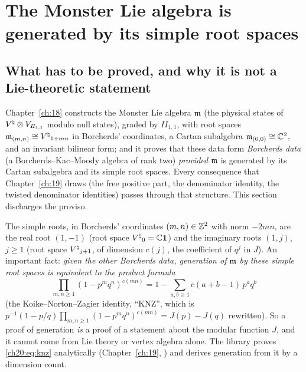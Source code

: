 \section{The Monster Lie algebra is generated by its simple root spaces}\label{ch20:sec:generation}

\subsection{What has to be proved, and why it is not a Lie-theoretic statement}

Chapter~\ref{ch:18} constructs the Monster Lie algebra $\mathfrak m$ (the physical states of ${V^{\natural}}\otimes V_{I\!I_{1,1}}$
modulo null states), graded by $I\!I_{1,1}$, with root spaces $\mathfrak m_{(m,n)}\cong{V^{\natural}}_{1+mn}$ in Borcherds' coordinates,
a Cartan subalgebra $\mathfrak m_{(0,0)}\cong{\mathbb{C}}^2$, and an invariant bilinear form; and it proves that these data form
\emph{Borcherds data} (a Borcherds--Kac--Moody algebra of rank two) \emph{provided} $\mathfrak m$ is generated by its Cartan
subalgebra and its simple root spaces.  Every consequence that Chapter~\ref{ch:19} draws (the free positive part, the
denominator identity, the twisted denominator identities) passes through that structure.  This section discharges the
proviso.

The simple roots, in Borcherds' coordinates $(m,n)\in{\mathbb{Z}}^2$ with norm $-2mn$, are the real root $(1,-1)$ (root space
${V^{\natural}}_0={\mathbb{C}}\mathbf 1$) and the imaginary roots $(1,j)$, $j\ge1$ (root space ${V^{\natural}}_{j+1}$, of dimension $c(j)$, the
coefficient of $q^j$ in $J$).  An important fact: \emph{given
the other Borcherds data, generation of $\mathfrak m$ by these simple root spaces is equivalent to the product formula}
\begin{equation}\label{ch20:eq:knz}
  \prod_{m,n\ge1}(1-p^mq^n)^{c(mn)}=1-\sum_{a,b\ge1}c(a+b-1)\,p^aq^b
\end{equation}
(the Koike--Norton--Zagier identity, ``KNZ'', which is $p^{-1}(1-p/q)\prod_{m,n\ge1}(1-p^mq^n)^{c(mn)}=J(p)-J(q)$
rewritten).  So a proof of generation \emph{is} a proof of a statement about the modular function $J$, and it cannot come
from Lie theory or vertex algebra alone.  The library proves \eqref{ch20:eq:knz} analytically (Chapter~\ref{ch:19},
) and derives generation from it by a dimension count.

